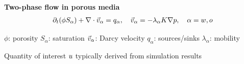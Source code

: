 \begin{frame}{\name{}}
    \setlength{\cw}{0.6\textwidth}%
    \def\dx{2em}%
    \begin{overlayarea}{\textwidth}{\frameheight}
        \vspace{0.1em}%
        \textbf{Two-phase flow in porous media}
        \begin{align*}
            \partial_t(\phi S_\alpha) + \nabla \cdot \vec v_\alpha = q_\alpha, \quad  \vec v_\alpha = -\lambda_\alpha K\nabla p, \quad \alpha = w, o
        \end{align*}
        \vspace{-1.7em}
        \begin{block}{}
            \small
            \begin{center}
                $\phi$: porosity \hspace{\dx} $S_\alpha$: saturation \hspace{\dx} $\vec v_\alpha$: Darcy velocity \hspace{\dx} $q_\alpha$: sources/sinks \hspace{\dx} $\lambda_\alpha$: mobility
            \end{center}
        \end{block}
        \vspace{0.3em}
        \begin{squarelist}
            \item<2-> Quantity of interest $u$ typically derived from simulation results
        \end{squarelist}
    \end{overlayarea}
\end{frame}

